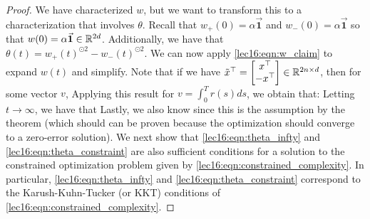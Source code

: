 \begin{proof}
We have characterized $w$, but we want to transform this to a characterization that involves $\theta$.
Recall that \(w_+(0) = \alpha \vec{\mathbf{1}}\) and \(w_-(0) = \alpha \vec{\mathbf{1}}\) so that \(w(0) = \alpha \vec{\mathbf{1}} \in \mathbb R^{2d}\). Additionally, we have that \(\theta(t) = w_+(t)^{\odot 2} - w_-(t)^{\odot 2} \).
We can now apply \eqref{lec16:eqn:w_claim} to expand \(w(t)\) and simplify. 
Note that if we have \(\tilde{x}^\top = \begin{bmatrix} x^\top \\ -x^\top \end{bmatrix} \in \mathbb R^{2n\times d}\), then for some vector \(v\),
Applying this result for $v = \int_0^T r(s) ds$, we obtain that:
Letting $t \to \infty$, we have that
Lastly, we also know 
 since this is the assumption by the theorem (which should can be proven because the optimization should converge to a zero-error solution). We next show that \eqref{lec16:eqn:theta_infty} and \eqref{lec16:eqn:theta_constraint} are also sufficient conditions for a solution to the constrained optimization problem given by \eqref{lec16:eqn:constrained_complexity}. In particular, \eqref{lec16:eqn:theta_infty} and \eqref{lec16:eqn:theta_constraint} correspond to the Karush-Kuhn-Tucker (or KKT) conditions of \eqref{lec16:eqn:constrained_complexity}.


\end{proof}

